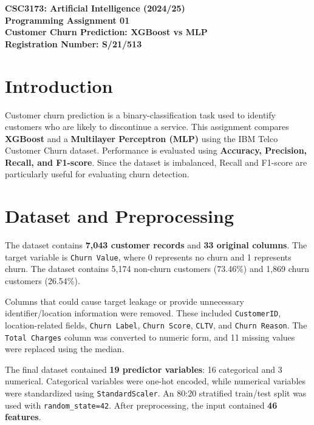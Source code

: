 \documentclass[10pt,a4paper]{article}
\begin{document}

\begin{center}
    {\Large\bfseries CSC3173: Artificial Intelligence (2024/25)}\\[0.25em]
    {\large\bfseries Programming Assignment 01}\\[0.35em]
    {\Large\bfseries Customer Churn Prediction: XGBoost vs MLP}\\[0.35em]
    \textbf{Registration Number: S/21/513}
\end{center}

\vspace{-0.35em}

\section{Introduction}

Customer churn prediction is a binary-classification task used to identify customers who are likely to discontinue a service. This assignment compares \textbf{XGBoost} and a \textbf{Multilayer Perceptron (MLP)} using the IBM Telco Customer Churn dataset. Performance is evaluated using \textbf{Accuracy, Precision, Recall, and F1-score}. Since the dataset is imbalanced, Recall and F1-score are particularly useful for evaluating churn detection.

\section{Dataset and Preprocessing}

The dataset contains \textbf{7,043 customer records} and \textbf{33 original columns}. The target variable is \texttt{Churn Value}, where 0 represents no churn and 1 represents churn. The dataset contains 5,174 non-churn customers (73.46\%) and 1,869 churn customers (26.54\%).

Columns that could cause target leakage or provide unnecessary identifier/location information were removed. These included \texttt{CustomerID}, location-related fields, \texttt{Churn Label}, \texttt{Churn Score}, \texttt{CLTV}, and \texttt{Churn Reason}. The \texttt{Total Charges} column was converted to numeric form, and 11 missing values were replaced using the median.

The final dataset contained \textbf{19 predictor variables}: 16 categorical and 3 numerical. Categorical variables were one-hot encoded, while numerical variables were standardized using \texttt{StandardScaler}. An 80:20 stratified train/test split was used with \texttt{random\_state=42}. After preprocessing, the input contained \textbf{46 features}.
\end{document}
